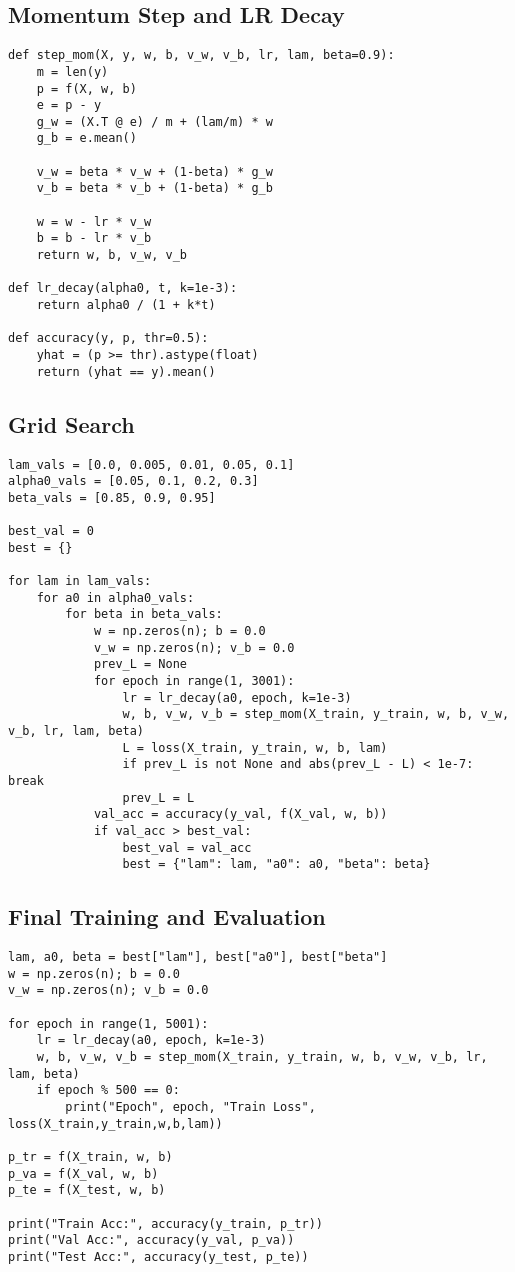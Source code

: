 \documentclass[12pt]{article}
\begin{document}
\subsection*{Momentum Step and LR Decay}
\begin{lstlisting}
def step_mom(X, y, w, b, v_w, v_b, lr, lam, beta=0.9):
    m = len(y)
    p = f(X, w, b)
    e = p - y
    g_w = (X.T @ e) / m + (lam/m) * w
    g_b = e.mean()

    v_w = beta * v_w + (1-beta) * g_w
    v_b = beta * v_b + (1-beta) * g_b

    w = w - lr * v_w
    b = b - lr * v_b
    return w, b, v_w, v_b

def lr_decay(alpha0, t, k=1e-3):
    return alpha0 / (1 + k*t)

def accuracy(y, p, thr=0.5):
    yhat = (p >= thr).astype(float)
    return (yhat == y).mean()
\end{lstlisting}

\subsection*{Grid Search}
\begin{lstlisting}
lam_vals = [0.0, 0.005, 0.01, 0.05, 0.1]
alpha0_vals = [0.05, 0.1, 0.2, 0.3]
beta_vals = [0.85, 0.9, 0.95]

best_val = 0
best = {}

for lam in lam_vals:
    for a0 in alpha0_vals:
        for beta in beta_vals:
            w = np.zeros(n); b = 0.0
            v_w = np.zeros(n); v_b = 0.0
            prev_L = None
            for epoch in range(1, 3001):
                lr = lr_decay(a0, epoch, k=1e-3)
                w, b, v_w, v_b = step_mom(X_train, y_train, w, b, v_w, v_b, lr, lam, beta)
                L = loss(X_train, y_train, w, b, lam)
                if prev_L is not None and abs(prev_L - L) < 1e-7: break
                prev_L = L
            val_acc = accuracy(y_val, f(X_val, w, b))
            if val_acc > best_val:
                best_val = val_acc
                best = {"lam": lam, "a0": a0, "beta": beta}
\end{lstlisting}

\subsection*{Final Training and Evaluation}
\begin{lstlisting}
lam, a0, beta = best["lam"], best["a0"], best["beta"]
w = np.zeros(n); b = 0.0
v_w = np.zeros(n); v_b = 0.0

for epoch in range(1, 5001):
    lr = lr_decay(a0, epoch, k=1e-3)
    w, b, v_w, v_b = step_mom(X_train, y_train, w, b, v_w, v_b, lr, lam, beta)
    if epoch % 500 == 0:
        print("Epoch", epoch, "Train Loss", loss(X_train,y_train,w,b,lam))

p_tr = f(X_train, w, b)
p_va = f(X_val, w, b)
p_te = f(X_test, w, b)

print("Train Acc:", accuracy(y_train, p_tr))
print("Val Acc:", accuracy(y_val, p_va))
print("Test Acc:", accuracy(y_test, p_te))
\end{lstlisting}
\end{document}
